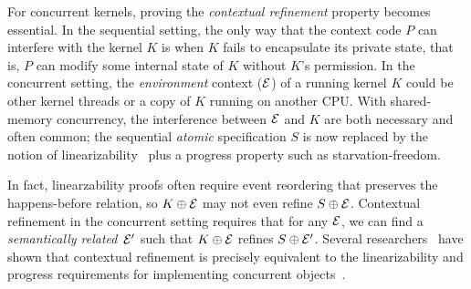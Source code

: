 {For concurrent kernels, proving the {\em contextual refinement}
property becomes essential. In the sequential setting, the only way
that the context code $P$ can interfere with the kernel $K$ is when
$K$ fails to encapsulate its private state, that is, $P$ can
modify some internal state of $K$ without $K$'s permission.
In the concurrent setting, the {\em environment} context ($\mathcal{E}$)
of a running kernel $K$ could be other kernel threads or a copy of $K$
running on another CPU. With shared-memory concurrency, the
interference between $\mathcal{E}$ and $K$ are both necessary and often
common; the sequential {\em atomic} specification $S$ is now replaced
by the notion of linearizability~\cite{herlihy90} plus a progress
property such as starvation-freedom.

In fact, linearzability proofs often require event reordering that
preserves the happens-before relation, so $K\,\!\oplus\!{}\,\mathcal{E}$ may not
even refine $S\,\!\oplus\!{}\,\mathcal{E}$.  Contextual refinement in the
concurrent setting requires that for any $\mathcal{E}$, we can find a {\em
  semantically related}\ $\mathcal{E}'$ such that $K\,\!\oplus\!{}\,\mathcal{E}$ refines
$S\,\!\oplus\!{}\,\mathcal{E}'$.  Several
researchers~\cite{filipovic10,liang13,lili16} have shown that
contextual refinement is precisely equivalent to the linearizability
and progress requirements for implementing concurrent
objects~\cite{Herlihy08book,herlihy90}.

}
